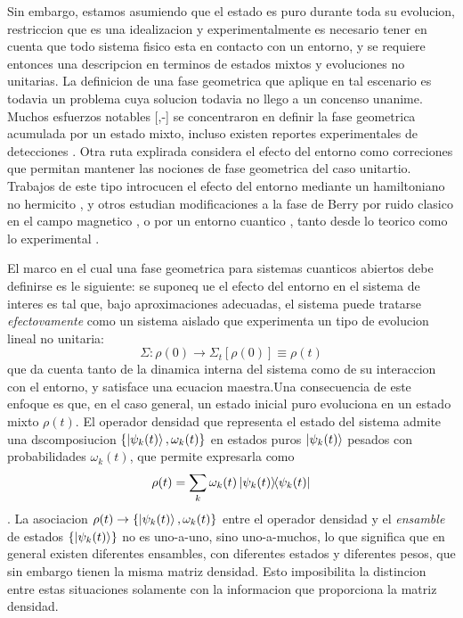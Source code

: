 Sin embargo, estamos asumiendo que el estado es puro durante toda su evolucion, restriccion que es una idealizacion y experimentalmente es necesario tener en cuenta que todo sistema fisico esta en contacto con un entorno, y se requiere entonces una descripcion en terminos de estados mixtos y evoluciones no unitarias. La definicion de una fase geometrica que aplique en tal escenario es todavia un problema cuya solucion todavia no llego a un concenso unanime. Muchos esfuerzos notables [\cite{6},\cite{8}-\cite{10}] se concentraron en definir la fase geometrica acumulada por un estado mixto, incluso existen reportes experimentales de detecciones \cite{73}. Otra ruta explirada considera el efecto del entorno como correciones que permitan mantener las nociones de fase geometrica del caso unitartio. Trabajos de este tipo introcucen el efecto del entorno mediante un hamiltoniano no hermicito \cite{32,33}, y otros estudian modificaciones a la fase de Berry por ruido clasico en el campo magnetico \cite{38}, o por un entorno cuantico \cite{39,40}, tanto desde lo teorico como lo experimental \cite{74,75}.

El marco en el cual una fase geometrica para sistemas cuanticos abiertos debe definirse es le siguiente: se suponeq ue el efecto del entorno en el sistema de interes es tal que, bajo aproximaciones adecuadas, el sistema puede tratarse \textit{efectovamente} como un sistema aislado que experimenta un tipo de evolucion lineal no unitaria:
\begin{equation}
    \Sigma:\rho(0)\rightarrow\Sigma_t[\rho(0)] \equiv \rho(t)
\end{equation}
que da cuenta tanto de la dinamica interna del sistema como de su interaccion con el entorno, y satisface una ecuacion maestra.Una consecuencia de este enfoque es que, en el caso general, un estado inicial puro evoluciona en un estado mixto $\rho(t)$. El operador densidad que representa el estado del sistema admite una dscomposiucion $\{ \ket{\psi_k(t)},\omega_k(t)\}$ en estados puros $\ket{\psi_k(t)}$ pesados con probabilidades $\omega_k(t)$, que permite expresarla como
\begin{equation}
    \rho(t)=\sum_k\omega_k(t)\ketbra{\psi_k(t)}{\psi_k(t)}
\end{equation}
. La asociacion $\rho(t)\rightarrow \{ \ket{\psi_k(t)},\omega_k(t)\}$ entre el operador densidad y el \textit{ensamble} de estados $\{\ket{\psi_k(t)}\}$ no es uno-a-uno, sino uno-a-muchos, lo que significa que en general existen diferentes ensambles, con diferentes estados y diferentes pesos, que sin embargo tienen la misma matriz densidad. Esto imposibilita la distincion entre estas situaciones solamente con la informacion que proporciona la matriz densidad.

